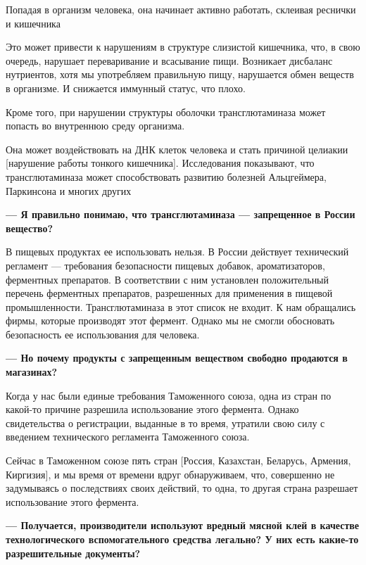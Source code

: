 \begin{fancyquotes}
    Попадая в организм человека, она начинает активно работать,
    склеивая реснички и 
    кишечника
\end{fancyquotes}

Это может привести к нарушениям в структуре слизистой кишечника,
что, в свою очередь, нарушает переваривание и всасывание пищи.
Возникает дисбаланс нутриентов, хотя мы употребляем правильную
пищу, нарушается обмен веществ в организме.
И снижается иммунный статус, что плохо.

Кроме того, при нарушении структуры оболочки трансглютаминаза
может попасть во внутреннюю среду организма.

\begin{fancyquotes}
    Она может воздействовать на ДНК клеток человека и
    стать причиной целиакии [нарушение работы тонкого кишечника].
    Исследования показывают, что трансглютаминаза может
    способствовать развитию болезней Альцгеймера,
    Паркинсона и многих других
\end{fancyquotes}

\textbf{--- Я правильно понимаю, что трансглютаминаза — запрещенное в России вещество?}

В пищевых продуктах ее использовать нельзя.
В России действует технический регламент --- требования безопасности пищевых
добавок, ароматизаторов, ферментных препаратов.
В соответствии с ним установлен положительный перечень ферментных препаратов,
разрешенных для применения в пищевой промышленности.
Трансглютаминаза в этот список не входит.
К нам обращались фирмы, которые производят этот фермент.
Однако мы не смогли обосновать безопасность ее использования
для человека.

\textbf{--- Но почему продукты с запрещенным веществом свободно продаются в магазинах?}

Когда у нас были единые требования Таможенного союза,
одна из стран по какой-то причине разрешила использование этого фермента.
Однако свидетельства о регистрации, выданные в то время,
утратили свою силу с введением технического регламента Таможенного союза.

Сейчас в Таможенном союзе пять стран [Россия, Казахстан,
Беларусь, Армения, Киргизия], и мы время от времени вдруг обнаруживаем,
что, совершенно не задумываясь о последствиях своих действий,
то одна, то другая страна разрешает использование этого фермента.

\textbf{--- Получается, производители используют вредный мясной клей
    в качестве технологического вспомогательного средства легально?
    У них есть какие-то разрешительные документы?}

